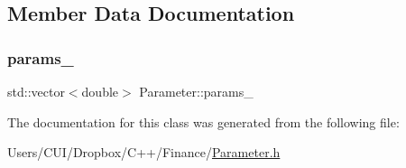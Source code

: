 \subsection{Member Data Documentation}
\hypertarget{class_parameter_abcbcc6573234afb8f6027d3c716917bb}{}\label{class_parameter_abcbcc6573234afb8f6027d3c716917bb} 
\subsubsection{\texorpdfstring{params\+\_\+}{params\_}}
{\footnotesize\ttfamily std\+::vector$<$double$>$ Parameter\+::params\+\_\+\hspace{0.3cm}{\ttfamily [protected]}}



The documentation for this class was generated from the following file\+:\begin{DoxyCompactItemize}
\item 
Users/\+C\+U\+I/\+Dropbox/\+C++/\+Finance/\hyperlink{_parameter_8h}{Parameter.\+h}\end{DoxyCompactItemize}
